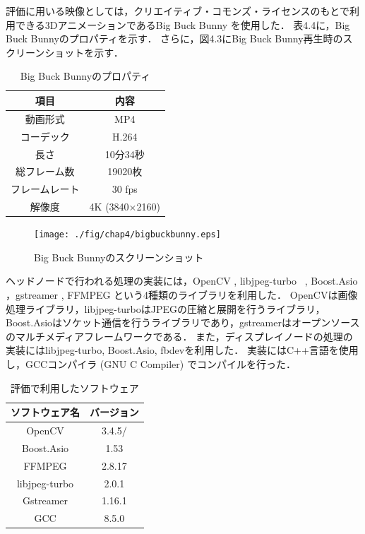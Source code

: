 評価に用いる映像としては，クリエイティブ・コモンズ・ライセンスのもとで利用できる3DアニメーションであるBig Buck Bunny \cite{bigbackbunny}を使用した．
表4.4に，Big Buck Bunnyのプロパティを示す．
さらに，図4.3にBig Buck Bunny再生時のスクリーンショットを示す．

\begin{table}[H]
    \caption{Big Buck Bunnyのプロパティ}
    \begin{center}
    \begin{tabular}{cc}
    \hline
    項目 & 内容 \\\hline\hline
    動画形式　& MP4 \\ \hline
    コーデック & H.264 \cite{h264} \\ \hline
    長さ & 10分34秒 \\ \hline
    総フレーム数 & 19020枚 \\ \hline
    フレームレート & 30 fps \\ \hline
    解像度 & 4K (3840×2160) \\ \hline

    \end{tabular}
    \end{center}
\end{table}

\begin{figure}[H]
    \hspace*{\fill}
    \texttt{[image: ./fig/chap4/bigbuckbunny.eps]}
    \hspace*{\fill}
    \caption{Big Buck Bunnyのスクリーンショット}
   \end{figure}

ヘッドノードで行われる処理の実装には，OpenCV \cite{opencv}, libjpeg-turbo ~\cite{libjpeg}, Boost.Asio \cite{asio}，gstreamer \cite{gstreamer} , FFMPEG \cite{ffmpeg}という4種類のライブラリを利用した． 
OpenCVは画像処理ライブラリ，libjpeg-turboはJPEGの圧縮と展開を行うライブラリ，Boost.Asioはソケット通信を行うライブラリであり，gstreamerはオープンソースのマルチメディアフレームワークである．
また，ディスプレイノードの処理の実装にはlibjpeg-turbo, Boost.Asio, fbdevを利用した．
実装にはC++言語を使用し，GCCコンパイラ (GNU C Compiler) \cite{gcc}でコンパイルを行った．


\begin{table}[H]
    \caption{評価で利用したソフトウェア}
    \begin{center}
    \begin{tabular}{cc}
    \hline
    ソフトウェア名 & バージョン \\\hline\hline
    OpenCV & 3.4.5/ \\ \hline
    Boost.Asio  & 1.53  \\ \hline
    FFMPEG & 2.8.17 \\ \hline
    libjpeg-turbo & 2.0.1 \\ \hline
    Gstreamer & 1.16.1 \\ \hline
    GCC & 8.5.0 \\ \hline

    \end{tabular}
    \end{center}
\end{table}


